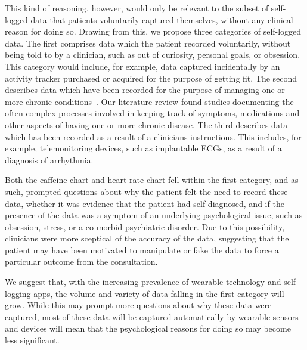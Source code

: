 \documentclass{sigchi}
\begin{document}
This kind of reasoning, however, would only be relevant to the subset of self-logged data that patients voluntarily captured themselves, without any clinical reason for doing so.  Drawing from this, we propose three categories of self-logged data. The first comprises data which the patient recorded voluntarily, without being told to by a clinician, such as out of curiosity, personal goals, or obsession. This category would include, for example, data captured incidentally by an activity tracker purchased or acquired for the purpose of getting fit. The second describes data which have been recorded for the purpose of managing one or more chronic conditions~\cite{ancker_invisible_2015}.  Our literature review found studies documenting the often complex processes involved in keeping track of symptoms, medications and other aspects of having one or more chronic disease. The third describes data which has been recorded as a result of a clinicians instructions. This includes, for example, telemonitoring devices, such as implantable ECGs, as a result of a diagnosis of arrhythmia.

Both the caffeine chart and heart rate chart fell within the first category, and as such, prompted questions about why the patient felt the need to record these data, whether it was evidence that the patient had self-diagnosed, and if the presence of the data was a symptom of an underlying psychological issue, such as obsession, stress, or a co-morbid psychiatric disorder. Due to this possibility, clinicians were more sceptical of the accuracy of the data, suggesting that the patient may have been motivated to manipulate or fake the data to force a particular outcome from the consultation.

We suggest that, with the increasing prevalence of wearable technology and self-logging apps, the volume and variety of data falling in the first category will grow.  While this may prompt more questions about why these data were captured, most of these data will be captured automatically by wearable sensors and devices will mean that the psychological reasons for doing so may become less significant.


\end{document}
